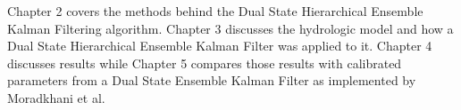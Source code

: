 	Chapter 2 covers the methods behind the Dual State Hierarchical Ensemble Kalman Filtering algorithm. Chapter 3 discusses the hydrologic model and how a Dual State Hierarchical Ensemble Kalman Filter was applied to it. Chapter 4 discusses results while Chapter 5 compares those results with calibrated parameters from a Dual State Ensemble Kalman Filter as implemented by Moradkhani et al.
	
	
	

	